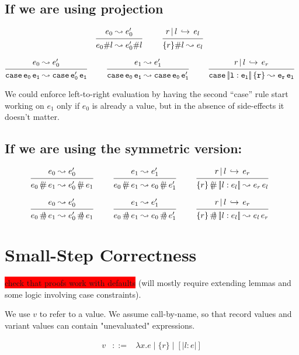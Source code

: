 \documentclass{article}
\newcommand{\todo}[1]{\colorbox{red}{#1}}
\newcommand{\define}{::=}
\newcommand{\variant}[1]{[\!|#1|\!]}
\newcommand{\case}[2]{\tt{case}\,#1\,#2}
\newcommand{\app}[2]{#1\,#2}
\newcommand{\lam}[2]{\lambda #1 . #2}
\newcommand{\projFun}{\,\langle\!\!\#\,}
\newcommand{\projArg}{\,\#\!\!\rangle\,}
\newcommand{\haslbltm}[3]{#1\,|\,#2\,\hookrightarrow\, #3}
\newcommand{\step}[2]{#1 \leadsto #2}
\newcommand{\deduct}[3][]
{
  \begin{prooftree}
    \hypo{#2}
    \infer1[\text{#1}]{#3}
  \end{prooftree}
}
\begin{document}
\subsection{If we are using projection}

\[
\deduct
    {\step{e_0}{e'_0}}
    {\step{e_0\#l}{e'_0\#l}}
    {}
\qquad
\deduct
    {\haslbltm{r}{l}{e_l}}
    {\step{\{r\}\#l}{e_l}}
    {}
\]

\[
\deduct
    {\step{e_0}{e'_0}}
    {\step{\case{e_0}{e_1}}{\case{e'_0}{e_1}}}
    {}
\qquad
\deduct
    {\step{e_1}{e'_1}}
    {\step{\case{e_0}{e_1}}{\case{e_0}{e'_1}}}
    {}
\qquad
\deduct
    {\haslbltm{r}{l}{e_r}}
    {\step{\case{\variant{l:e_l}}{\{r\}}}{\app{e_r}{e_l}}}
    {}
\]

We could enforce left-to-right evaluation by having the second ``case'' rule
start working on $e_1$ only if $e_0$
is already a value, but in the absence of side-effects it doesn't matter.

\subsection{If we are using the symmetric version:}

\[
\deduct
   {\step{e_0}{e'_0}}
   {\step{e_0 \projFun e_1}{e'_0 \projFun e_1}}
   {}
\qquad
\deduct
   {\step{e_1}{e'_1}}
   {\step{e_0 \projFun e_1}{e_0 \projFun e'_1}}
   {}
\qquad
\deduct
   {\haslbltm{r}{l}{e_r}}
   {\step{\{r\} \projFun \variant{l:e_l}}{\app{e_r}{e_l}}}
   {}
\]

\[
\deduct
   {\step{e_0}{e'_0}}
   {\step{e_0 \projArg e_1}{e'_0 \projArg e_1}}
   {}
\qquad
\deduct
   {\step{e_1}{e'_1}}
   {\step{e_0 \projArg e_1}{e_0 \projArg e'_1}}
   {}
\qquad
\deduct
   {\haslbltm{r}{l}{e_r}}
   {\step{\{r\} \projArg \variant{l:e_l}}{\app{e_l}{e_r}}}
   {}
\]

\section{Small-Step Correctness}

\todo {check that proofs work with defaults} (will mostly require extending
lemmas and some logic involving case constraints).

\bigskip


We use $v$ to refer to a value. We assume call-by-name, so that record values and
variant values can contain "unevaluated" expressions.

\[\begin{array}{rcl}
v & \define & \lam{x}{e} \mid \{r\} \mid \variant{l:e}\\
\end{array}
\]
\end{document}
